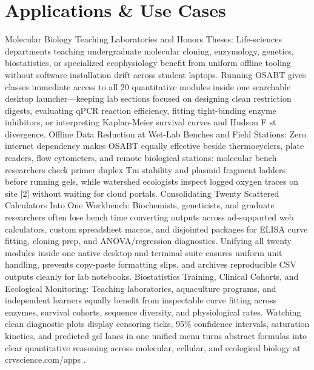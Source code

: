 \documentclass[10pt,letterpaper]{article}
\begin{document}
\section{Applications \& Use Cases}
Molecular Biology Teaching Laboratories and Honors Theses: Life-sciences departments teaching undergraduate molecular cloning, enzymology, genetics, biostatistics, or specialized ecophysiology benefit from uniform offline tooling without software installation drift across student laptops. Running OSABT gives classes immediate access to all 20 quantitative modules inside one searchable desktop launcher---keeping lab sections focused on designing clean restriction digests, evaluating qPCR reaction efficiency, fitting tight-binding enzyme inhibitors, or interpreting Kaplan-Meier survival curves and Hudson F st divergence. Offline Data Reduction at Wet-Lab Benches and Field Stations: Zero internet dependency makes OSABT equally effective beside thermocyclers, plate readers, flow cytometers, and remote biological stations: molecular bench researchers check primer duplex Tm stability and plasmid fragment ladders before running gels, while watershed ecologists inspect logged oxygen traces on site [2] without waiting for cloud portals. Consolidating Twenty Scattered Calculators Into One Workbench: Biochemists, geneticists, and graduate researchers often lose bench time converting outputs across ad-supported web calculators, custom spreadsheet macros, and disjointed packages for ELISA curve fitting, cloning prep, and ANOVA/regression diagnostics. Unifying all twenty modules inside one native desktop and terminal suite ensures uniform unit handling, prevents copy-paste formatting slips, and archives reproducible CSV outputs cleanly for lab notebooks. Biostatistics Training, Clinical Cohorts, and Ecological Monitoring: Teaching laboratories, aquaculture programs, and independent learners equally benefit from inspectable curve fitting across enzymes, survival cohorts, sequence diversity, and physiological rates. Watching clean diagnostic plots display censoring ticks, 95\% confidence intervals, saturation kinetics, and predicted gel lanes in one unified menu turns abstract formulas into clear quantitative reasoning across molecular, cellular, and ecological biology at crvscience.com/apps .
\end{document}
